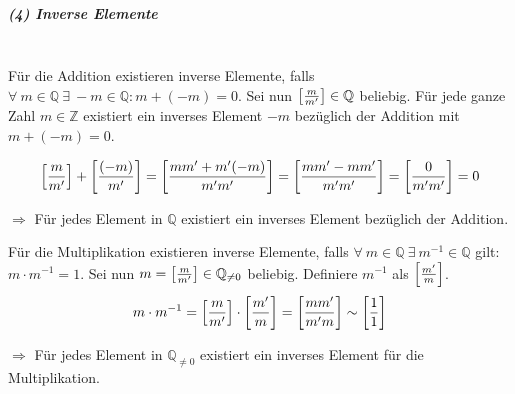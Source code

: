 \documentclass{scrreprt}
\begin{document}
\newpage
\subparagraph{(4) Inverse Elemente}

\:\\
Für die Addition existieren inverse Elemente, falls
$\forall \: m \in \mathbb{Q} \: \exists \: -m \in \mathbb{Q} \colon m + (-m)
= 0$.
Sei nun $\qty[\frac{m}{m'}] \in \mathbb{Q}$ beliebig.
Für jede ganze Zahl $m \in \mathbb{Z}$ existiert ein inverses Element $-m$
bezüglich der Addition mit $m + (-m) = 0$.

\[
  \qty[\frac{m}{m'}] + \qty[\frac{(-m)}{m'}] = \qty[\frac{mm' + m'(-m)}{m'm'}]
  = \qty[\frac{mm' - mm'}{m'm'}] = \qty[\frac{0}{m'm'}] = 0
\]

$\Rightarrow$ Für jedes Element in $\mathbb{Q}$ existiert ein inverses
Element bezüglich der Addition.


Für die Multiplikation existieren inverse Elemente, falls
$\forall \: m \in \mathbb{Q} \: \exists \: m^{-1} \in \mathbb{Q}$ gilt: \\
$m \cdot m^{-1} = 1$.
Sei nun $m = \qty[\frac{m}{m'}] \in \mathbb{Q}_{\ne 0}$ beliebig.
Definiere $m^{-1}$ als $\qty[\frac{m'}{m}]$.
\[
  m \cdot m^{-1} = \qty[\frac{m}{m'}] \cdot \qty[\frac{m'}{m}]
  = \qty[\frac{mm'}{m'm}]
  \sim \qty[\frac{1}{1}]
\]

$\Rightarrow$ Für jedes Element in $\mathbb{Q}_{\ne 0}$ existiert ein inverses
Element für die Multiplikation.
\end{document}
